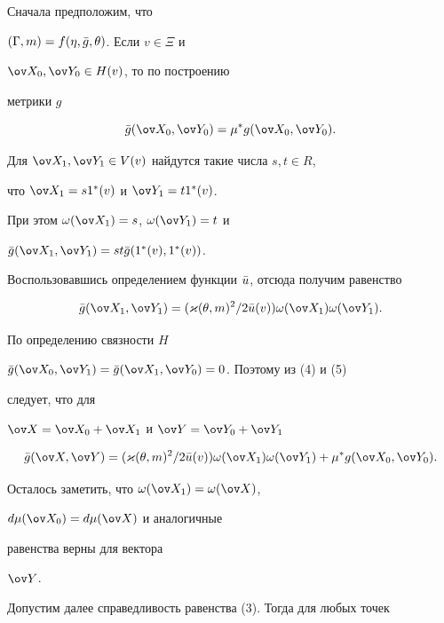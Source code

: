 \begin{pf} Сначала предположим, что 


$(\Gamma,m)=f(\eta,\Bar g,\theta)$. Если $v\in\Xi$ и 


$\ov X_0,\ov Y_0\in H(v)$, то по построению 


метрики $g$ 


\begin{equation} 


\Bar g(\ov X_0,\ov Y_0)=\mu^*g(\ov X_0,\ov Y_0).


\end{equation} 


Для $\ov X_1,\ov Y_1\in V(v)$ найдутся такие числа $s,t\in R$, 


что $\ov X_1=s1^*(v)$ и $\ov Y_1=t1^*(v)$. 


При этом $\omega(\ov X_1)=s$, $\omega(\ov Y_1)=t$ и 


$\Bar g(\ov X_1,\ov Y_1)=st\Bar g(1^*(v),1^*(v))$. 


Воспользовавшись определением функции $\Bar u$, отсюда получим равенство 


\begin{equation} 


\Bar g(\ov X_1,\ov Y_1)=(\varkappa(\theta,m)^2/2\Bar u(v)) 


\omega(\ov X_1)\omega(\ov Y_1). 


\end{equation} 


По определению связности $H\;$ 


$\Bar g(\ov X_0,\ov Y_1)=\Bar g(\ov X_1,\ov Y_0)=0$. Поэтому из (4) и (5) 


следует, что для 


$\ov X=\ov X_0+\ov X_1$ и $\ov Y=\ov Y_0+\ov Y_1$ 


$$ 


\Bar g(\ov X,\ov Y)=(\varkappa(\theta,m)^2/2\Bar u(v)) 


\omega(\ov X_1)\omega(\ov Y_1)+ 


\mu^*g(\ov X_0,\ov Y_0). 


$$ 


Осталось заметить, что $\omega(\ov X_1)=\omega(\ov X)$, 


$d\mu(\ov X_0)=d\mu(\ov X)$ и аналогичные 


равенства верны для вектора 


$\ov Y$. 


 


Допустим далее справедливость равенства (3). Тогда для любых точек 



\end{pf}
